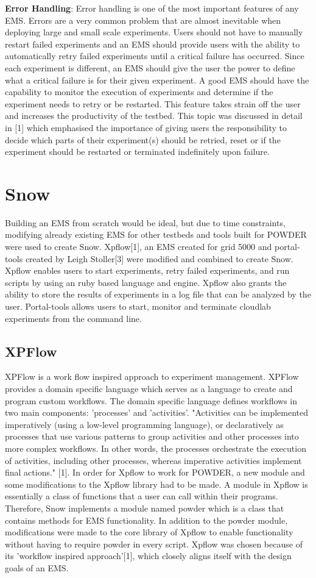 \documentclass[11pt,twocolumn,letterpaper]{article}
\begin{document}
\textbf{Error Handling}:
Error handling is one of the most important features of any EMS.  Errors are a very common problem that are almost inevitable when deploying large and small scale experiments.  Users should not have to manually restart failed experiments and an EMS should provide users with the ability to automatically retry failed experiments until a critical failure has occurred.  Since each experiment is different, an EMS should give the user the power to define what a critical failure is for their given experiment. A good EMS should have the capability to monitor the execution of experiments and determine if the experiment needs to retry or be restarted.  This feature takes strain off the user and increases the productivity of the testbed. This topic was discussed in detail in [1] which emphasised the importance of giving users the responsibility to decide which parts of their experiment(s) should be retried, reset or if the experiment should be restarted or terminated indefinitely upon failure. 
\section{Snow}
\quad Building an EMS from scratch would be ideal, but due to time constraints, modifying already existing EMS for other testbeds and tools built for POWDER were used to create  Snow.  Xpflow[1], an EMS created for grid 5000 and portal-tools created by Leigh Stoller[3] were modified and combined to create Snow.  Xpflow enables users to start experiments, retry failed experiments, and run scripts by using an ruby based language and engine.  Xpflow also grants the ability to store the results of experiments in a log file that can be analyzed by the user.  Portal-tools allows users to start, monitor and terminate cloudlab experiments from the command line.  
\subsection{XPFlow}
\quad XPFlow is a work flow inspired approach to experiment management.  XPFlow provides a domain specific language which serves as a language to create and program custom workflows.  The domain specific language defines workflows in two main components: 'processes' and 'activities'.  "Activities can be implemented imperatively (using a low-level programming language), or declaratively as processes that use various patterns to group activities and other processes into more complex workflows. In other words, the processes orchestrate the execution of activities, including other processes, whereas imperative activities implement final actions." [1].   \newline
\quad In order for Xpflow to work for POWDER, a new module and some modifications to the Xpflow library had to be made. A module in Xpflow is essentially a class of functions that a user can call within their programs.  Therefore, Snow implements a module named powder which is a class that contains methods for EMS functionality. In addition to the powder module, modifications were made to the core library of Xpflow to enable functionality without having to require powder in every script. Xpflow was chosen because of its 'workflow inspired approach'[1], which closely aligns itself with the design goals of an EMS. 
\end{document}
